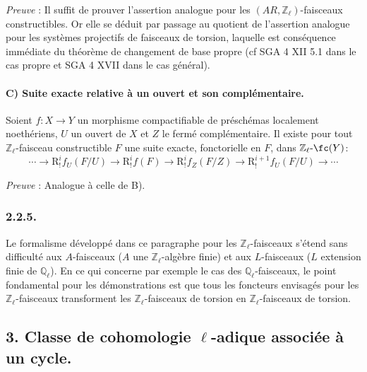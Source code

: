 \emph{Preuve} : Il suffit de prouver l'assertion analogue pour les \((AR,\mathbb{Z}_\ell)\)-faisceaux constructibles. Or elle se déduit par passage au quotient de l'assertion analogue pour les systèmes projectifs de faisceaux de torsion, laquelle est conséquence immédiate du théorème de changement de base propre (cf SGA 4 XII 5.1 dans le cas propre et SGA 4 XVII dans le cas général).

\paragraph{C) Suite exacte relative à un ouvert et son complémentaire.}
Soient \(f:X\to Y\) un morphisme compactifiable de préschémas localement noethériens, \(U\) un ouvert de \(X\) et \(Z\) le fermé complémentaire. Il existe pour tout \(\mathbb{Z}_\ell\)-faisceau constructible \(F\) une suite exacte, fonctorielle en \(F\), dans \(\mathbb{Z}_\ell\text{-}\fc(Y)\):
\[
\cdots\longrightarrow \mathrm{R}^i_!f_U(F/U)
\longrightarrow \mathrm{R}^i_!f(F)
\longrightarrow \mathrm{R}^i_!f_Z(F/Z)
\longrightarrow \mathrm{R}^{i+1}_!f_U(F/U)
\longrightarrow\cdots
\]

\emph{Preuve} : Analogue à celle de B).

\subsubsection*{2.2.5.}
Le formalisme développé dans ce paragraphe pour les \(\mathbb{Z}_\ell\)-faisceaux s'étend sans difficulté aux \(A\)-faisceaux (\(A\) une \(\mathbb{Z}_\ell\)-algèbre finie) et aux \(L\)-faisceaux (\(L\) extension finie de \(\mathbb{Q}_\ell\)). En ce qui concerne par exemple le cas des \(\mathbb{Q}_\ell\)-faisceaux, le point fondamental pour les démonstrations est que
tous les foncteurs envisagés pour les \(\mathbb{Z}_\ell\)-faisceaux transforment les \(\mathbb{Z}_\ell\)-faisceaux de torsion en \(\mathbb{Z}_\ell\)-faisceaux de torsion.

\subsection*{3. Classe de cohomologie \(\ell\)-adique associée à un cycle.}


